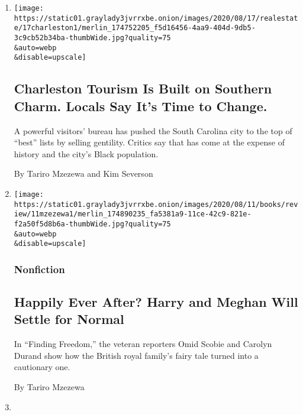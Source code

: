 \begin{enumerate}
\def\labelenumi{\arabic{enumi}.}
\item
  \href{/2020/08/12/travel/charleston-tourism-black-lives-matter.html}{}

  \texttt{[image: https://static01.graylady3jvrrxbe.onion/images/2020/08/17/realestate/17charleston1/merlin\_174752205\_f5d16456-4aa9-404d-9db5-3c9cb52b34ba-thumbWide.jpg?quality=75\\\&auto=webp\\\&disable=upscale]}

  \hypertarget{charleston-tourism-is-built-on-southern-charm-locals-say-its-time-to-change}{%
  \subsection{Charleston Tourism Is Built on Southern Charm. Locals Say
  It's Time to
  Change.}\label{charleston-tourism-is-built-on-southern-charm-locals-say-its-time-to-change}}

  A powerful visitors' bureau has pushed the South Carolina city to the
  top of ``best'' lists by selling gentility. Critics say that has come
  at the expense of history and the city's Black population.

  By Tariro Mzezewa and Kim Severson
\item
  \href{/2020/08/11/books/review/finding-freedom-omid-scobie-carolyn-durand.html}{}

  \texttt{[image: https://static01.graylady3jvrrxbe.onion/images/2020/08/11/books/review/11mzezewa1/merlin\_174890235\_fa5381a9-11ce-42c9-821e-f2a50f5d8b6a-thumbWide.jpg?quality=75\\\&auto=webp\\\&disable=upscale]}

  \hypertarget{nonfiction}{%
  \subsubsection{Nonfiction}\label{nonfiction}}

  \hypertarget{happily-ever-after-harry-and-meghan-will-settle-for-normal}{%
  \subsection{Happily Ever After? Harry and Meghan Will Settle for
  Normal}\label{happily-ever-after-harry-and-meghan-will-settle-for-normal}}

  In ``Finding Freedom,'' the veteran reporters Omid Scobie and Carolyn
  Durand show how the British royal family's fairy tale turned into a
  cautionary one.

  By Tariro Mzezewa
\item
  \href{/2020/08/10/t-magazine/amber-pinkerton-photography.html}{}


\end{enumerate}
